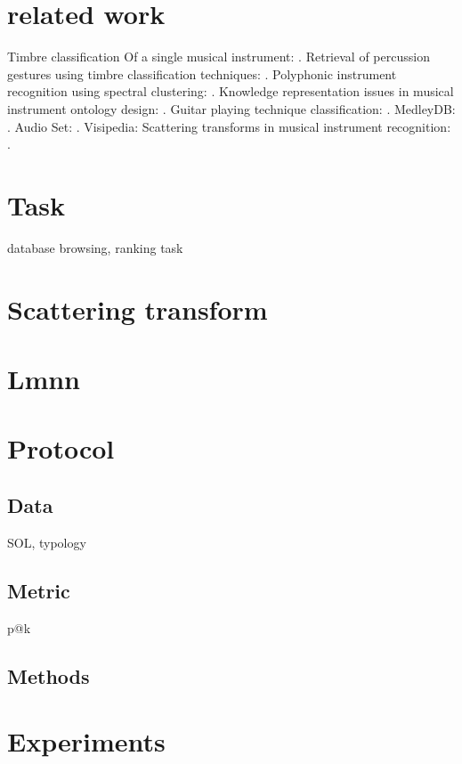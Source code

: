 \documentclass{article}
\begin{document}
\section{related work}
Timbre classification Of a single musical instrument: \cite{loureiro2004ismir}.
Retrieval of percussion gestures using timbre classification techniques: \cite{tindale2004ismir}.
Polyphonic instrument recognition using spectral clustering: \cite{martins2007ismir}.
Knowledge representation issues in musical instrument ontology design: \cite{kolozali2011ismir}.
Guitar playing technique classification: \cite{su2014ismir}.
MedleyDB: \cite{bittner2014ismir}.
Audio Set: \cite{gemmeke2017icassp}.
Visipedia: \cite{belongie2015pattern}
Scattering transforms in musical instrument recognition: \cite{tjoa2010ismir,lostanlen2017phd}.



\section{Task}

database browsing, ranking task



\section{Scattering transform}



\section{Lmnn}

\section{Protocol}

\subsection{Data}

SOL, typology

\subsection{Metric}

p@k

\subsection{Methods}


\section{Experiments}










\end{document}
